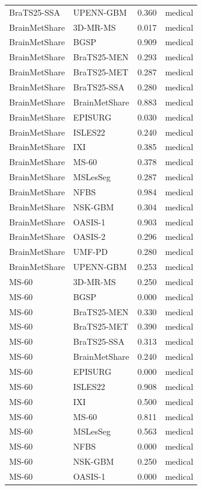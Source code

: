 \begin{tabular}{llrl}
BraTS25-SSA & UPENN-GBM & 0.360 & medical \\
BrainMetShare & 3D-MR-MS & 0.017 & medical \\
BrainMetShare & BGSP & 0.909 & medical \\
BrainMetShare & BraTS25-MEN & 0.293 & medical \\
BrainMetShare & BraTS25-MET & 0.287 & medical \\
BrainMetShare & BraTS25-SSA & 0.280 & medical \\
BrainMetShare & BrainMetShare & 0.883 & medical \\
BrainMetShare & EPISURG & 0.030 & medical \\
BrainMetShare & ISLES22 & 0.240 & medical \\
BrainMetShare & IXI & 0.385 & medical \\
BrainMetShare & MS-60 & 0.378 & medical \\
BrainMetShare & MSLesSeg & 0.287 & medical \\
BrainMetShare & NFBS & 0.984 & medical \\
BrainMetShare & NSK-GBM & 0.304 & medical \\
BrainMetShare & OASIS-1 & 0.903 & medical \\
BrainMetShare & OASIS-2 & 0.296 & medical \\
BrainMetShare & UMF-PD & 0.280 & medical \\
BrainMetShare & UPENN-GBM & 0.253 & medical \\
MS-60 & 3D-MR-MS & 0.250 & medical \\
MS-60 & BGSP & 0.000 & medical \\
MS-60 & BraTS25-MEN & 0.330 & medical \\
MS-60 & BraTS25-MET & 0.390 & medical \\
MS-60 & BraTS25-SSA & 0.313 & medical \\
MS-60 & BrainMetShare & 0.240 & medical \\
MS-60 & EPISURG & 0.000 & medical \\
MS-60 & ISLES22 & 0.908 & medical \\
MS-60 & IXI & 0.500 & medical \\
MS-60 & MS-60 & 0.811 & medical \\
MS-60 & MSLesSeg & 0.563 & medical \\
MS-60 & NFBS & 0.000 & medical \\
MS-60 & NSK-GBM & 0.250 & medical \\
MS-60 & OASIS-1 & 0.000 & medical \\

\end{tabular}
